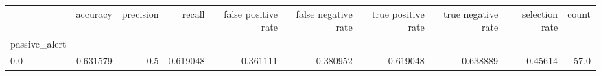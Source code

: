\begin{tabular}{lrrrrrrrrr}
\toprule
{} &  accuracy &  precision &    recall &  false positive rate &  false negative rate &  true positive rate &  true negative rate &  selection rate &  count \\
passive\_alert &           &            &           &                      &                      &                     &                     &                 &        \\
\midrule
0.0           &  0.631579 &        0.5 &  0.619048 &             0.361111 &             0.380952 &            0.619048 &            0.638889 &         0.45614 &   57.0 \\
\bottomrule
\end{tabular}
